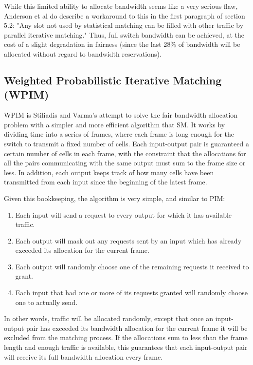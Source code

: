 While this limited ability to allocate bandwidth seems like a very serious flaw, Anderson et al do describe a workaround to this in the first paragraph of section 5.2: "Any slot not used by statistical matching can be filled with other traffic by parallel iterative matching." Thus, full switch bandwidth can be achieved, at the cost of a slight degradation in fairness (since the last 28\% of bandwidth will be allocated without regard to bandwidth reservations).

\subsection{Weighted Probabilistic Iterative Matching (WPIM)}
WPIM is Stiliadis and Varma's attempt to solve the fair bandwidth allocation problem with a simpler and more efficient algorithm that SM. It works by dividing time into a series of frames, where each frame is long enough for the switch to transmit a fixed number of cells. Each input-output pair is guaranteed a certain number of cells in each frame, with the constraint that the allocations for all the pairs communicating with the same output must sum to the frame size or less. In addition, each output keeps track of how many cells have been transmitted from each input since the beginning of the latest frame.

Given this bookkeeping, the algorithm is very simple, and similar to PIM:

\begin{enumerate}
\item Each input will send a request to every output for which it has available traffic.
\item Each output will mask out any requests sent by an input which has already exceeded its allocation for the current frame.
\item Each output will randomly choose one of the remaining requests it received to grant.
\item Each input that had one or more of its requests granted will randomly choose one to actually send.
\end{enumerate}

In other words, traffic will be allocated randomly, except that once an input-output pair has exceeded its bandwidth allocation for the current frame it will be excluded from the matching process. If the allocations sum to less than the frame length and enough traffic is available, this guarantees that each input-output pair will receive its full bandwidth allocation every frame.

